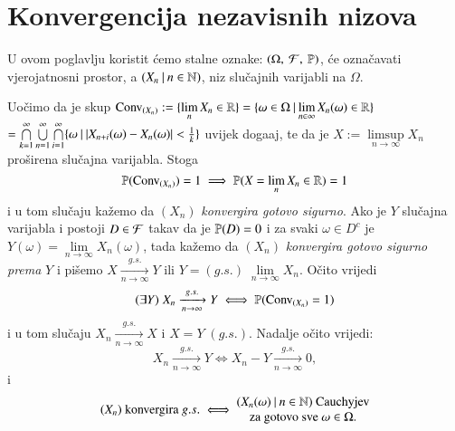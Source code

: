
\chapter{Konvergencija nezavisnih nizova}

U ovom poglavlju koristit \' cemo stalne oznake: $(\Omega, \: \mathcal{F}, \: \mathbb{P})$, \' ce ozna\v cavati vjerojatnosni prostor, a $({X_n} \: | \: {n \in \mathbb{N}})$, niz slu\v cajnih varijabli na $\Omega$.

Uo\v cimo da je skup $\mathrm{Conv}_{(X_n)} := \{ \lim\limits_{n} X_n \in \mathbb{R} \} = \{{\omega \in \Omega} \: | \: {\lim\limits_{n \in \infty} X_n (\omega) \in \mathbb{R}}\}$\\
$ = \bigcap\limits_{k = 1}^{\infty} \bigcup\limits_{n = 1}^{\infty} \bigcap\limits_{i = 1}^{\infty} \{{\omega} \: | \: {|X_{n + i} (\omega) - X_n (\omega)| < \frac{1}{k}}\}$ uvijek doga\dj aj, te da je $X:= \limsup\limits_{n \to \infty} X_n$ pro\v sirena slu\v cajna varijabla.
Stoga
\begin{equation}    \label{jed:11.1}
    \mathbb{P}({\mathrm{Conv}_{(X_n)}}) = 1 \implies \mathbb{P}({X = \lim\limits_n X_n \in \mathbb{R}}) = 1
\end{equation}
i u tom slu\v caju ka\v zemo da $(X_n)$ \emph{konvergira gotovo sigurno}.
Ako je $Y$ slu\v cajna varijabla i postoji $D \in \mathcal{F}$ takav da je $\mathbb{P}({D}) = 0$ i za svaki $\omega \in D^c$ je $Y(\omega) = \lim\limits_{n \to \infty} X_n (\omega)$, tada ka\v zemo da $(X_n)$ \emph{konvergira gotovo sigurno prema} $Y$ i pi\v semo $X \xrightarrow[n \to \infty]{g.s.} Y$ ili $Y = (g.s.) \; \lim\limits_{n \to \infty} X_n$.
O\v cito vrijedi
\begin{equation}    \label{jed:11.2}
    (\exists Y) \; X_n \xrightarrow[n \to \infty]{g.s.} Y \iff \mathbb{P}({\mathrm{Conv}_{(X_n)} = 1})
\end{equation}
i u tom slu\v caju $X_n \xrightarrow[n \to \infty]{g.s.} X$ i $X = Y \; (g.s.)$.
Nadalje o\v cito vrijedi:
\begin{equation}    \label{jed:11.3}
    X_n \xrightarrow[n \to \infty]{g.s.} Y \iff X_n - Y \xrightarrow[n \to \infty]{g.s.} 0,
\end{equation}
i
\begin{equation}    \label{jed:11.4}
    (X_n) \textnormal{ konvergira } g.s.
    \iff
    \begin{matrix}
        ({X_n(\omega)} \: | \: {n \in \mathbb{N}}) \textnormal{ Cauchyjev}\\
        \textnormal{za gotovo sve } \omega \in \Omega.
    \end{matrix}
\end{equation}

